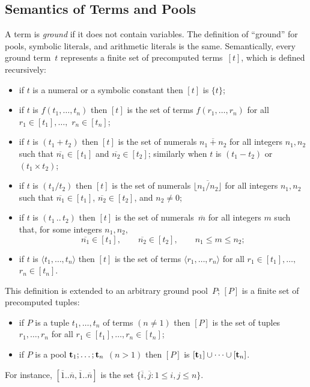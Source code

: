 \documentclass{tlp}
\begin{document}
\subsection{Semantics of Terms and Pools}

A term is {\sl ground} if it does not contain variables. The definition of
``ground'' for pools, symbolic literals, and arithmetic literals is the same.
Semantically, every ground term~$t$  represents a finite
set of precomputed terms~$[t]$, which is defined recursively:
\begin{itemize}
\item if $t$ is a numeral or a symbolic constant then $[t]$ is
$\{t\}$;
\item if $t$ is $f(t_1, \dots, t_n)$  then $[t]$ is the set of
terms $f(r_1, \dots, r_n)$ for all
$r_1 \in [t_1], \dots,$ $r_n \in [t_n]$;
\item if $t$ is $(t_1 + t_2)$ then $[t]$ is the set
of numerals $\overline {n_1 + n_2}$ for all integers $n_1, n_2$ such that
$\overline {n_1} \in [t_1]$ and $\overline {n_2} \in [t_2]$; similarly when $t$ is
$(t_1 - t_2)$ or $(t_1 \times t_2)$;
\item if $t$ is $(t_1 / t_2)$ then $[t]$ is the set
of numerals $\overline{\lfloor n_1/n_2 \rfloor}$ for all
integers $n_1, n_2$ such that
$\overline {n_1} \in [t_1]$, $\overline {n_2} \in [t_2]$, and $n_2\neq 0$;
\item if $t$ is $(t_1\, ..\, t_2)$ then $[t]$ is the set of
numerals~$\overline m$ for all integers $m$ such that,
for some integers $n_1, n_2,$
$$ \overline{n_1} \in [t_1], \qquad \overline{n_2} \in [t_2], \qquad
n_1 \leq m \leq n_2;$$
\item if $t$ is $\langle t_1, \dots, t_n\rangle$
then $[t]$ is the set of terms
$\langle r_1, \dots, r_n \rangle$ for all $r_1 \in [t_1],\dots,$ $r_n \in [t_n]$.
\end{itemize}
This definition is extended to an arbitrary ground pool~$P$; $[P]$
is a finite set of precomputed tuples:
\begin{itemize}
\item if $P$ is a tuple $t_1, \dots, t_n$ of terms $(n \not = 1)$
then $[P]$ is the set of tuples $r_1, \dots, r_n$ for all
\hbox{$r_1 \in [t_1], \dots, r_n \in [t_n]$};
\item if $P$ is a pool ${\bf t}_1; \dots; {\bf t}_n$ $(n > 1)$ then
$[P]$ is $[{\bf t}_1] \cup \dots \cup [{\bf t}_n]$.
\end{itemize}

For instance, $[\overline 1..\overline n,\overline 1..\overline n]$ is the set
$\{\overline i , \overline j : 1 \leq i,j \leq n \}$.
\end{document}
